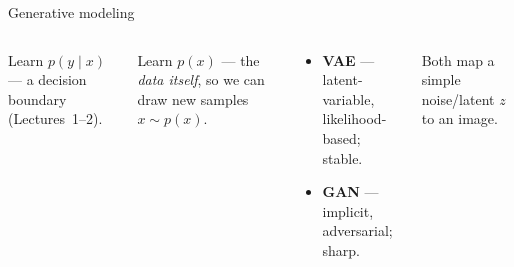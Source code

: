 \documentclass[
11pt,notheorems,hyperref={pdfauthor=whatever}
]{beamer}
\begin{document}
\begin{frame}{Generative modeling}
\small
\begin{columns}[c,onlytextwidth]
    \begin{tcolorbox}[medicalglass, title=\textbf{\color{accTeal}Discriminative}]
    Learn $p(y\mid x)$ --- a decision boundary (Lectures~1--2).
    \end{tcolorbox}
    \begin{tcolorbox}[medicalglass, title=\textbf{\color{accAmber}Generative}]
    Learn $p(x)$ --- the \emph{data itself}, so we can draw new samples $x\sim p(x)$.
    \end{tcolorbox}

    \begin{tcolorbox}[medicalglass, title=\textbf{\color{accGreen}Two families we cover}]
    \begin{itemize}\small\setlength\itemsep{0.4em}
        \item \textbf{VAE} --- latent-variable, likelihood-based; stable.
        \item \textbf{GAN} --- implicit, adversarial; sharp.
    \end{itemize}
    \end{tcolorbox}
    {\footnotesize \textcolor{gray!55}{Both map a simple noise/latent $z$ to an image.}}
\end{columns}
\end{frame}
\end{document}
